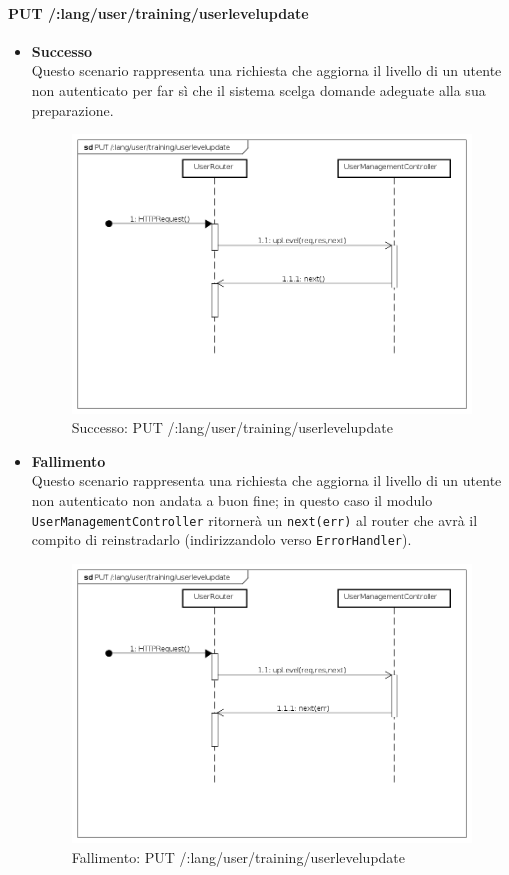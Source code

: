 \paragraph{PUT /:lang/user/training/userlevelupdate}
\begin{itemize}
\item \textbf{Successo}\\
Questo scenario rappresenta una richiesta che aggiorna il livello di un utente non autenticato per far sì che il sistema scelga domande adeguate alla sua preparazione.

\begin{figure}[ht]
	\centering
	\includegraphics[scale=0.45]{UML/DiagrammiDiSequenza/Back-end/PUT__lang_user_training_userlevelupdate_success.png}
	\caption{Successo: PUT /:lang/user/training/userlevelupdate}
\end{figure}
\FloatBarrier

\item \textbf{Fallimento}\\
Questo scenario rappresenta una richiesta che aggiorna il livello di un utente non autenticato non andata a buon fine; in questo caso il modulo \texttt{UserManagementController} ritornerà un \texttt{next(err)} al router che avrà il compito di reinstradarlo (indirizzandolo verso \texttt{ErrorHandler}).

\begin{figure}[ht]
	\centering
	\includegraphics[scale=0.45]{UML/DiagrammiDiSequenza/Back-end/PUT__lang_user_training_userlevelupdate_failure.png}
	\caption{Fallimento: PUT /:lang/user/training/userlevelupdate}
\end{figure}
\FloatBarrier

\end{itemize} 